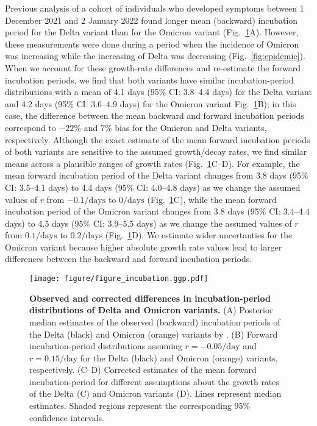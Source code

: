 \documentclass[12pt]{article}
\newcommand{\fref}[1]{Fig.~\ref{fig:#1}}
\begin{document}
Previous analysis of a cohort of individuals who developed symptoms between 1 December 2021 and 2 January 2022 found longer mean (backward) incubation period for the Delta variant than for the Omicron variant \citep{backer2021omicron} (\fref{incubation}A).
However, these measurements were done during a period when the incidence of Omicron was increasing while the increasing of Delta was decreasing (\fref{epidemic}).
When we account for these growth-rate differences and re-estimate the forward incubation periods, we find that both variants have similar incubation-period distributions with a mean of 4.1 days (95\% CI: 3.8--4.4 days) for the Delta variant and 4.2 days (95\% CI: 3.6--4.9 days) for the Omicron variant \fref{incubation}B);
in this case, the difference between the mean backward and forward incubation periods correspond to $-22\%$ and $7\%$ bias for the Omicron and Delta variants, respectively.
Although the exact estimate of the mean forward incubation periods of both variants are sensitive to the assumed growth/decay rates, we find similar means across a plausible ranges of growth rates (\fref{incubation}C--D).
For example, the mean forward incubation period of the Delta variant changes from 3.8 days (95\% CI: 3.5--4.1 days) to 4.4 days (95\% CI: 4.0--4.8 days) as we change the assumed values of $r$ from $-0.1/\mathrm{days}$ to $0/\mathrm{days}$ (\fref{incubation}C),
while the mean forward incubation period of the Omicron variant changes from 3.8 days (95\% CI: 3.4--4.4 days) to 4.5 days (95\% CI: 3.9--5.5 days) as we change the assumed values of $r$ from $0.1/\mathrm{days}$ to $0.2/\mathrm{days}$ (\fref{incubation}D).
We estimate wider uncertanties for the Omicron variant because higher absolute growth rate values lead to larger differences between the backward and forward incubation periods.

\begin{figure}[!th]
\texttt{[image: figure/figure\_incubation.ggp.pdf]}
\caption{
\textbf{Observed and corrected differences in incubation-period distributions of Delta and Omicron variants.}
(A) Posterior median estimates of the observed (backward) incubation periods of the Delta (black) and Omicron (orange) variants by \cite{backer2021omicron}.
(B) Forward incubation-period distributions assuming $r=-0.05/\mathrm{day}$ and $r=0.15/\mathrm{day}$ for the Delta (black) and Omicron (orange) variants, respectively.
(C--D) Corrected estimates of the mean forward incubation-period for different assumptions about the growth rates of the Delta (C) and Omicron variants (D).
Lines represent median estimates.
Shaded regions represent the corresponding 95\% confidence intervals.
\label{fig:incubation}
}
\end{figure}
\end{document}
